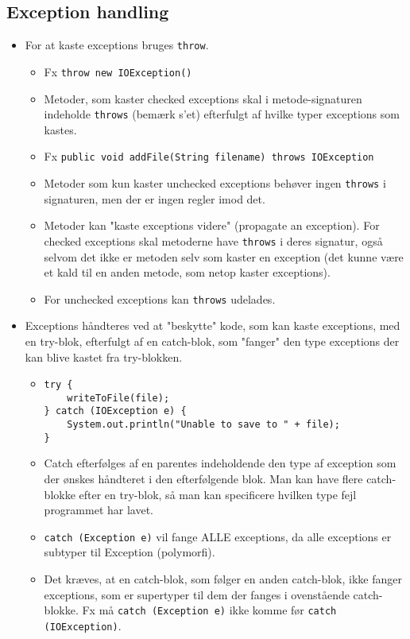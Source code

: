 \subsection{Exception handling}
\begin{itemize}
  \item For at kaste exceptions bruges \verb|throw|.
  \begin{itemize}
    \item Fx \verb|throw new IOException()|
    \item Metoder, som kaster checked exceptions skal i metode-signaturen indeholde \verb|throws| (bemærk s'et) efterfulgt af hvilke typer exceptions som kastes.
    \item Fx \verb|public void addFile(String filename) throws IOException|
    \item Metoder som kun kaster unchecked exceptions behøver ingen \verb|throws| i signaturen, men der er ingen regler imod det.
    \item Metoder kan "kaste exceptions videre" (propagate an exception). For checked exceptions skal metoderne have \verb|throws| i deres signatur, også selvom det ikke er metoden selv som kaster en exception (det kunne være et kald til en anden metode, som netop kaster exceptions).
    \item For unchecked exceptions kan \verb|throws| udelades.
  \end{itemize}
  \item Exceptions håndteres ved at "beskytte" kode, som kan kaste exceptions, med en try-blok, efterfulgt af en catch-blok, som "fanger" den type exceptions der kan blive kastet fra try-blokken.
  \begin{itemize}
    \item
      \begin{verbatim}
try {
    writeToFile(file);
} catch (IOException e) {
    System.out.println("Unable to save to " + file);
}
      \end{verbatim}
    \item Catch efterfølges af en parentes indeholdende den type af exception som der ønskes håndteret i den efterfølgende blok. Man kan have flere catch-blokke efter en try-blok, så man kan specificere hvilken type fejl programmet har lavet.
    \item \verb|catch (Exception e)| vil fange ALLE exceptions, da alle exceptions er subtyper til Exception (polymorfi).
    \item Det kræves, at en catch-blok, som følger en anden catch-blok, ikke fanger exceptions, som er supertyper til dem der fanges i ovenstående catch-blokke. Fx må \verb|catch (Exception e)| ikke komme før \verb|catch (IOException)|.

\end{itemize}
\end{itemize}

